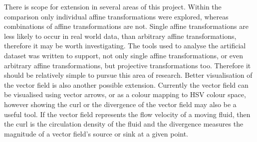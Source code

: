 There is scope for extension in several areas of this project. Within the comparison only individual affine transformations were explored, whereas combinations of affine transformations are not. Single affine transformations are less likely to occur in real world data, than arbitrary affine transformations, therefore it may be worth investigating. The tools used to analyse the artificial dataset was written to support, not only single affine transformations, or even arbitrary affine transformations, but projective transformations too. Therefore it should be relatively simple to pursue this area of research. Better visualisation of the vector field is also another possible extension. Currently the vector field can be visualised using vector arrows, or as a colour mapping to HSV colour space, however showing the curl or the divergence of the vector field may also be a useful tool. If the vector field represents the flow velocity of a moving fluid, then the curl is the circulation density of the fluid and the divergence measures the magnitude of a vector field's source or sink at a given point.